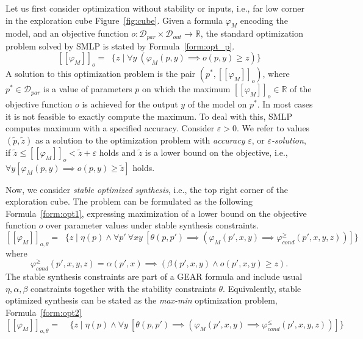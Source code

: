 \documentclass[a4paper,parskip=half]{article} %
\newcommand\removed[1]{}
\newcommand\added[1]{#1}
\newcommand\changedto[2]{%
    \removed{#1}%
    \added{#2}}
\newcommand*\eqdef=
\newcommand*\regmax[2]{[[{#1}]]_{#2}}
\newcommand*\objv{o}
\begin{document}
Let us first consider optimization without stability or inputs, i.e., far low corner in the exploration cube Figure~\ref{fig:cube}. 
Given a formula
$\varphi_M$ encoding the model, and an objective function 
$\objv:
\mathcal{D}_{\mathit{par}}\times
\mathcal{D}_\mathit{out}\to\mathbb R$, the
standard optimization problem solved by SMLP is stated by Formula~\eqref{form:opt_p}.
 \begin{equation}\label{form:opt_p}
 \regmax{\varphi_M}{\objv}
 \eqdef\mathop{\max\limits_{p}} \{z \mid  
    \forall y\changedto[{~(} \varphi_M(p,y)  \implies  
    \objv(p,y) \geq z
    \changedto])\}
\end{equation}
A solution to this optimization problem  is the pair $(p^*,\regmax{\varphi_M}{\objv})$, where 
$p^*{}\in\mathcal{D}_{\mathit{par}}$ is a value of parameters $p$ on which the maximum 
$\regmax{\varphi_M}{\objv}\in\mathbb R$ of the objective function $\objv$ is achieved
for the output $y$ of the model on $p^*$.
In most cases it is not feasible to exactly compute the maximum.
To deal with this, SMLP computes maximum with a specified accuracy. 
Consider $\varepsilon >0$.  We refer to  values $(\tilde p,\tilde z)$ as a solution to the optimization problem with
\emph{accuracy} $\varepsilon$, or \emph{$\varepsilon$-solution},
if $\tilde z\leq \regmax{ \varphi_M}{\objv}  <\tilde z+\varepsilon$ holds and
$\tilde z$ is a lower bound on the objective, i.e., $\forall y [ \varphi_M(p,y)  \implies  
    \objv(p,y) \geq \tilde z] $ holds.


Now, we consider \emph{stable optimized synthesis}, i.e., the top right corner of the exploration cube.
The problem can be formulated as the following Formula~\eqref{form:opt1}, expressing maximization of a lower bound  
on the objective function $\objv$ over parameter values under stable synthesis constraints.
%
\begin{equation}\label{form:opt1}
\regmax{\varphi_M}{\objv,\theta}
\eqdef\mathop{\max\limits_{p}} \{z \mid\eta(p) \wedge
    \forall p'~
    \forall x y~[
    \theta(p,p') \implies
    (\varphi_M(p',x,y)  \implies 
     \varphi_{\mathit{cond}}^{\geq}(p',x,y,z))
    ]\}
\end{equation}
where
\[
\varphi_{\mathit{cond}}^{\geq}(p',x,y,z)
\eqdef \alpha(p',x) \implies (\beta(p',x,y) \wedge \objv(p',x,y) \geq z).
\]
%
The stable synthesis constraints are part of a GEAR formula and include usual $\eta, \alpha, \beta$ constraints together with the stability constraints $\theta$.
Equivalently, stable optimized synthesis can be stated as the \emph{max-min} optimization problem, Formula~\eqref{form:opt2}
\begin{equation}\label{form:opt2}
\regmax{\varphi_M}{\objv,\theta}
\eqdef
\mathop{\max\limits_{p}} \mathop{\min\limits_{x, p'}}
\{ z \mid \eta(p) \wedge
    \forall y~[
     \theta(p,p') \implies
     (\varphi_M(p',x,y)  \implies  \varphi_{\mathit{cond}}^{\leq}(p',x,y,z))]\}
\end{equation}
\end{document}
